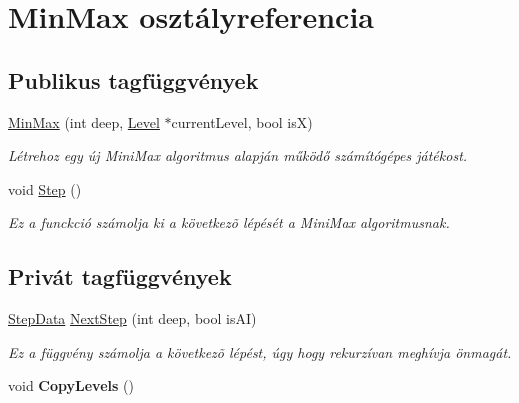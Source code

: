 \hypertarget{class_min_max}{}\section{Min\+Max osztályreferencia}
\label{class_min_max}
\subsection*{Publikus tagfüggvények}
\begin{DoxyCompactItemize}
\item 
\hyperlink{class_min_max_a15fb56ebb61d033eced1ae2ae43252a9}{Min\+Max} (int deep, \hyperlink{class_level}{Level} $\ast$current\+Level, bool isX)
\begin{DoxyCompactList}\small\item\em Létrehoz egy új Mini\+Max algoritmus alapján működő számítógépes játékost. \end{DoxyCompactList}\item 
void \hyperlink{class_min_max_a8448a9ea304b2890ddca4a123de5693b}{Step} ()
\begin{DoxyCompactList}\small\item\em Ez a funckció számolja ki a következõ lépését a Mini\+Max algoritmusnak. \end{DoxyCompactList}\end{DoxyCompactItemize}
\subsection*{Privát tagfüggvények}
\begin{DoxyCompactItemize}
\item 
\hyperlink{struct_step_data}{Step\+Data} \hyperlink{class_min_max_ab491c411792412ad53665cbce23c0286}{Next\+Step} (int deep, bool is\+AI)
\begin{DoxyCompactList}\small\item\em Ez a függvény számolja a következõ lépést, úgy hogy rekurzívan meghívja önmagát. \end{DoxyCompactList}\item 
\mbox{\label{class_min_max_a80ae5176daca604a8a949a9a03c10036}} 
void {\bfseries Copy\+Levels} ()
\end{DoxyCompactItemize}
